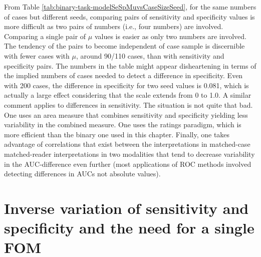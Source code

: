 \documentclass[
]{book}
\begin{document}
From Table \ref{tab:binary-task-modelSeSpMuvsCaseSizeSeed}, for the same numbers of cases but different seeds, comparing pairs of sensitivity and specificity values is more difficult as two pairs of numbers (i.e., four numbers) are involved. Comparing a single pair of \(\mu\) values is easier as only two numbers are involved. The tendency of the pairs to become independent of case sample is discernible with fewer cases with \(\mu\), around 90/110 cases, than with sensitivity and specificity pairs. The numbers in the table might appear disheartening in terms of the implied numbers of cases needed to detect a difference in specificity. Even with 200 cases, the difference in specificity for two seed values is 0.081, which is actually a large effect considering that the scale extends from 0 to 1.0. A similar comment applies to differences in sensitivity. The situation is not quite that bad. One uses an area measure that combines sensitivity and specificity yielding less variability in the combined measure. One uses the ratings paradigm, which is more efficient than the binary one used in this chapter. Finally, one takes advantage of correlations that exist between the interpretations in matched-case matched-reader interpretations in two modalities that tend to decrease variability in the AUC-difference even further (most applications of ROC methods involved detecting differences in AUCs not absolute values).

\hypertarget{binary-task-model-sensitivity-specificity-inverse-variation}{%
\section{Inverse variation of sensitivity and specificity and the need for a single FOM}\label{binary-task-model-sensitivity-specificity-inverse-variation}}
\end{document}
